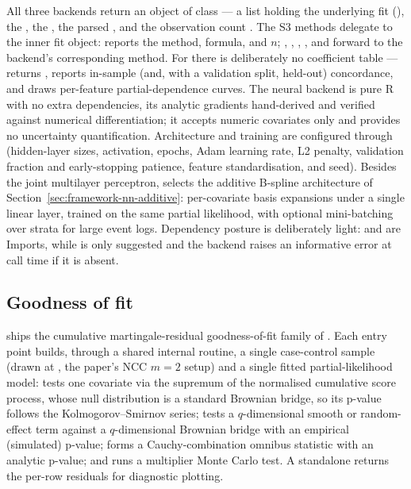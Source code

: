 All three backends return an object of class  --- a list holding the
underlying fit (), the , the , the parsed
, and the observation count . The S3 methods delegate to the
inner fit object:  reports the method, formula, and \(n\);
, , ,
, and  forward to the backend's
corresponding method. For  there is deliberately no
coefficient table ---  returns , 
reports in-sample (and, with a validation split, held-out) concordance, and
 draws per-feature partial-dependence curves. The
neural backend is pure R with no extra dependencies, its analytic gradients
hand-derived and verified against numerical differentiation; it accepts
numeric covariates only and provides no uncertainty quantification.
Architecture and training are configured through 
(hidden-layer sizes, activation, epochs, Adam learning rate, L2 penalty,
validation fraction and early-stopping patience, feature standardisation, and
seed). Besides the joint multilayer perceptron,  selects the additive
B-spline architecture of Section~\ref{sec:framework-nn-additive}: per-covariate
basis expansions under a single linear layer, trained on the same partial
likelihood, with optional mini-batching over strata for large event logs. Dependency posture is deliberately light:  and
 are Imports, while  is only suggested and the 
backend raises an informative error at call time if it is absent.

\subsection{Goodness of fit}
\label{sec:software-gof}

 ships the cumulative martingale-residual goodness-of-fit family of
\citet{boschi2025gof}. Each entry point builds, through a shared internal routine, a single
case-control sample (drawn at , the paper's NCC \(m=2\)
setup) and a single fitted partial-likelihood model:
 tests one covariate via the supremum of the normalised
cumulative score process, whose null distribution is a standard Brownian bridge,
so its p-value follows the Kolmogorov--Smirnov series;
 tests a \(q\)-dimensional smooth or random-effect
term against a \(q\)-dimensional Brownian bridge with an empirical (simulated)
p-value;  forms a Cauchy-combination omnibus statistic with
an analytic p-value; and  runs a multiplier Monte Carlo
test. A standalone  returns the per-row residuals
for diagnostic plotting.

